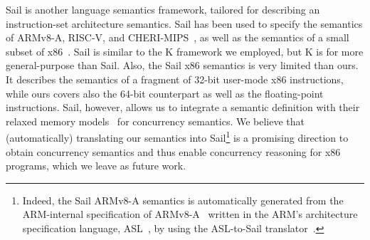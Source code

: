 Sail is another language semantics framework, tailored for describing an instruction-set architecture semantics.  Sail has been used to specify the semantics of ARMv8-A, RISC-V, and CHERI-MIPS~\cite{sail-popl2019}, as well as the semantics of a small subset of x86~\cite{sail-x86}.  Sail is similar to the K framework we employed, but K is for more general-purpose than Sail.  Also, the Sail x86 semantics is very limited than ours.  It describes the semantics of a fragment of 32-bit user-mode x86 instructions, while ours covers also the 64-bit counterpart as well as the floating-point instructions.
%
Sail, however, allows us to integrate a semantic definition with their relaxed memory models~\cite{rmem} for concurrency semantics.  We believe that (automatically) translating our semantics into Sail\footnote{Indeed, the Sail ARMv8-A semantics is automatically generated from the ARM-internal specification of ARMv8-A~\cite{Reid2017} written in the ARM's architecture specification language, ASL~\cite{asl}, by using the ASL-to-Sail translator~\cite{sail-popl2019}.} is a promising direction to obtain concurrency semantics and thus enable concurrency reasoning for x86 programs, which we leave as future work.
